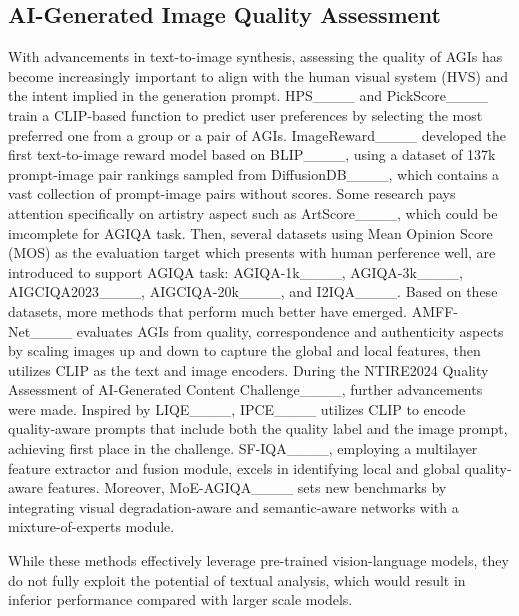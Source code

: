\subsection{AI-Generated Image Quality Assessment}
With advancements in text-to-image synthesis, assessing the quality of AGIs has become increasingly important to align with the human visual system (HVS) and the intent implied in the generation prompt.
HPS____ and PickScore____ train a CLIP-based function to predict user preferences by selecting the most preferred one from a group or a pair of AGIs.
ImageReward____ developed the first text-to-image reward model based on BLIP____, using a dataset of 137k prompt-image pair rankings sampled from DiffusionDB____, which contains a vast collection of prompt-image pairs without scores. 
Some research pays attention specifically on artistry aspect such as ArtScore____, which could be imcomplete for AGIQA task.
Then, several datasets using Mean Opinion Score (MOS) as the evaluation target which presents with human perference well, are introduced to support AGIQA task: AGIQA-1k____, AGIQA-3k____, AIGCIQA2023____, AIGCIQA-20k____, and I2IQA____. 
Based on these datasets, more methods that perform much better have emerged.
AMFF-Net____ evaluates AGIs from quality, correspondence and authenticity aspects by scaling images up and down to capture the global and local features, then utilizes CLIP as the text and image encoders.
During the NTIRE2024 Quality Assessment of AI-Generated Content Challenge____, further advancements were made.
Inspired by LIQE____, IPCE____ utilizes CLIP to encode quality-aware prompts that include both the quality label and the image prompt, achieving first place in the challenge.
SF-IQA____, employing a multilayer feature extractor and fusion module, excels in identifying local and global quality-aware features.
Moreover, MoE-AGIQA____ sets new benchmarks by integrating visual degradation-aware and semantic-aware networks with a mixture-of-experts module.

While these methods effectively leverage pre-trained vision-language models, they do not fully exploit the potential of textual analysis, which would result in inferior performance compared with larger scale models.

